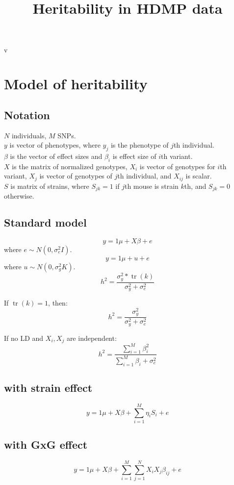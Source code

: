 \documentclass[12pt]{article}
\DeclareMathOperator{\tr}{tr}
\begin{document}
\title{Heritability in HDMP data}
v

\section{Model of heritability}
\subsection{Notation}
$N$ individuals, $M$ SNPs.\\
$y$ is vector of phenotypes, where $y_{j}$ is the phenotype of $j$th individual.\\
$\beta$ is the vector of effect sizes and $\beta_i$ is effect size of $i$th variant.\\
$X$ is the matrix of normalized genotypes, $X_i$ is vector of genotypes for $i$th variant, $X_j$ is vector of genotypes of $j$th individual, and $X_{ij}$ is scalar.\\
$S$ is matrix of strains, where $S_{jk} = 1$ if $j$th mouse is strain $k$th, and $S_{jk} = 0$ otherwise. \\

\subsection{Standard model}


\begin{equation}
y = 1 \mu + X \beta + e
\end{equation}
where $e \sim N(0, \sigma_e^2 I)$.\\

\begin{equation}
y = 1\mu + u + e
\end{equation}
where $u \sim N(0,\sigma_g^2 K)$.\\

\begin{equation}
h^2 = \frac {\sigma_y^2 * \tr(k)} {\sigma_y^2 + \sigma_e^2}
\end{equation}

If $\tr(k) = 1$, then: 
\begin{equation} 
h^2 = \frac {\sigma_y^2} {\sigma_y^2 + \sigma_e^2}
\end{equation}


If no LD and $X_i, X_j$ are independent:
\begin{equation}
h^2 = \frac {\sum\limits_{i=1}^{M}{\beta_i^2}} {\sum\limits_{i=1}^{M}{\beta_i} + \sigma_e^2}
\end{equation}


\subsection{with strain effect}

\begin{equation}
y = 1 \mu + X \beta + \sum\limits_{i=1}^{M}{\eta_i S_i} + e
\end{equation}

\subsection{with GxG effect}
\begin{equation}
y = 1 \mu + X \beta + \sum\limits_{i=1}^{M} \sum\limits_{j=1}^{N}{X_i X_j \beta_{ij}}+  e
\end{equation}
\end{document}
